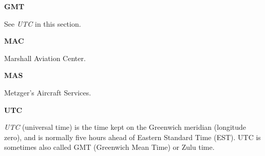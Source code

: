 \documentclass[letterpaper,10pt,titlepage]{article}
\newenvironment{docglossaryenum}{\begin{list}
               {}{\setlength{\labelwidth}{0mm}
                  \setlength{\leftmargin}{4mm}
                  \setlength{\itemindent}{-4mm}
                  \setlength{\parsep}{0.85mm}}}
               {\end{list}}
\begin{document}
\begin{docglossaryenum}

\item {}\textbf{GMT}

      See \emph{UTC} in this section.

\item \textbf{MAC}

      Marshall Aviation Center.

\item \textbf{MAS}

      Metzger's Aircraft Services.

\item {}\textbf{UTC}

      \emph{UTC} (universal time)
      is the time kept on the Greenwich meridian (longitude zero), and is 
      normally five hours ahead of 
      Eastern Standard Time (EST).
      UTC is sometimes also called 
      GMT (Greenwich Mean Time)
      or Zulu time.

\end{docglossaryenum}


\clearpage{}
\end{document}
